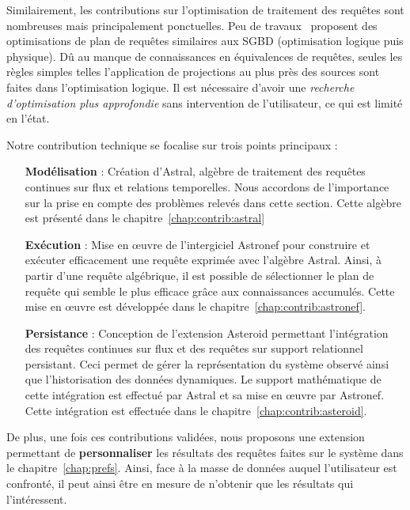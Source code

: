 Similairement, les contributions sur l'optimisation de traitement des requêtes sont nombreuses mais principalement ponctuelles. Peu de travaux~\cite{Galpin:snee,Kramer:semantics} proposent des optimisations de plan de requêtes similaires aux SGBD (optimisation logique puis physique). Dû au manque de connaissances en équivalences de requêtes, seules les règles simples telles l'application de projections au plus près des sources sont faites dans l'optimisation logique. Il est nécessaire d'avoir une \textit{recherche d'optimisation plus approfondie} sans intervention de l'utilisateur, ce qui est limité en l'état.

Notre contribution technique se focalise sur trois points principaux :
\begin{itemize}
 \item[\textbf{Modélisation}] : Création d'Astral, algèbre de traitement des requêtes continues sur flux et relations temporelles. Nous accordons de l'importance sur la prise en compte des problèmes relevés dans cette section. Cette algèbre est présenté dans le chapitre~\ref{chap:contrib:astral}
 \item[\textbf{Exécution}] : Mise en œuvre de l'intergiciel Astronef pour construire et exécuter efficacement une requête exprimée avec l'algèbre Astral. Ainsi, à partir d'une requête algébrique, il est possible de sélectionner le plan de requête qui semble le plus efficace grâce aux connaissances accumulés. Cette mise en œuvre est développée dans le chapitre~\ref{chap:contrib:astronef}.
 \item[\textbf{Persistance}] : Conception de l'extension Asteroid permettant l'intégration des requêtes continues sur flux et des requêtes sur support relationnel persistant. Ceci permet de gérer la représentation du système observé ainsi que l'historisation des données dynamiques. Le support mathématique de cette intégration est effectué par Astral et sa mise en œuvre par Astronef. Cette intégration est effectuée dans le chapitre~\ref{chap:contrib:asteroid}.
\end{itemize}

De plus, une fois ces contributions validées, nous proposons une extension permettant de \textbf{personnaliser} les résultats des requêtes faites sur le système dans le chapitre~\ref{chap:prefs}. Ainsi, face à la masse de données auquel l'utilisateur est confronté, il peut ainsi être en mesure de n'obtenir que les résultats qui l'intéressent.

